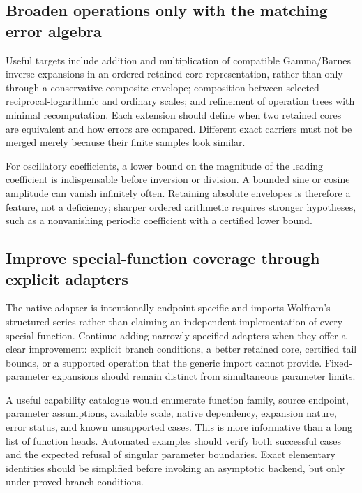 \documentclass[11pt,a4paper]{article}
\begin{document}
\subsection{Broaden operations only with the matching error algebra}
Useful targets include addition and multiplication of compatible Gamma/Barnes inverse expansions in an ordered retained-core representation, rather than only through a conservative composite envelope; composition between selected reciprocal-logarithmic and ordinary scales; and refinement of operation trees with minimal recomputation. Each extension should define when two retained cores are equivalent and how errors are compared. Different exact carriers must not be merged merely because their finite samples look similar.\cite{repo-gamma,repo-operations,repo-envelope}

For oscillatory coefficients, a lower bound on the magnitude of the leading coefficient is indispensable before inversion or division. A bounded sine or cosine amplitude can vanish infinitely often. Retaining absolute envelopes is therefore a feature, not a deficiency; sharper ordered arithmetic requires stronger hypotheses, such as a nonvanishing periodic coefficient with a certified lower bound.

\subsection{Improve special-function coverage through explicit adapters}
The native adapter is intentionally endpoint-specific and imports Wolfram's structured series rather than claiming an independent implementation of every special function. Continue adding narrowly specified adapters when they offer a clear improvement: explicit branch conditions, a better retained core, certified tail bounds, or a supported operation that the generic import cannot provide. Fixed-parameter expansions should remain distinct from simultaneous parameter limits.\cite{repo-native,repo-guide}

A useful capability catalogue would enumerate function family, source endpoint, parameter assumptions, available scale, native dependency, expansion nature, error status, and known unsupported cases. This is more informative than a long list of function heads. Automated examples should verify both successful cases and the expected refusal of singular parameter boundaries. Exact elementary identities should be simplified before invoking an asymptotic backend, but only under proved branch conditions.
\end{document}
